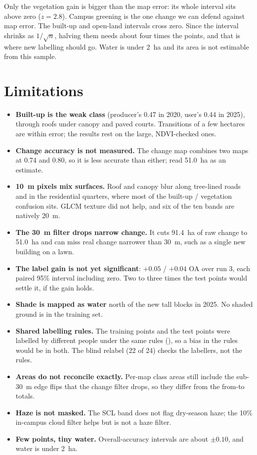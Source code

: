 \documentclass[11pt,a4paper]{article}
\begin{document}
Only the vegetation gain is bigger than the map error: its whole interval sits above zero ($z = 2.8$). Campus greening is the one change we can defend against map error. The built-up and open-land intervals cross zero. Since the interval shrinks as $1/\sqrt{n}$, halving them needs about four times the points, and that is where new labelling should go. Water is under 2~ha and its area is not estimable from this sample.

\section{Limitations}
\begin{itemize}
  \item \textbf{Built-up is the weak class} (producer's 0.47 in 2020, user's 0.44 in 2025), through roofs under canopy and paved courts. Transitions of a few hectares are within error; the results rest on the large, NDVI-checked ones.
  \item \textbf{Change accuracy is not measured.} The change map combines two maps at 0.74 and 0.80, so it is less accurate than either; read 51.0~ha as an estimate.
  \item \textbf{10~m pixels mix surfaces.} Roof and canopy blur along tree-lined roads and in the residential quarters, where most of the built-up / vegetation confusion sits. GLCM texture did not help, and six of the ten bands are natively 20~m.
  \item \textbf{The 30~m filter drops narrow change.} It cuts 91.4~ha of raw change to 51.0~ha and can miss real change narrower than 30~m, such as a single new building on a lawn.
  \item \textbf{The label gain is not yet significant}: $+0.05$ / $+0.04$ OA over run 3, each paired 95\% interval including zero. Two to three times the test points would settle it, if the gain holds.
  \item \textbf{Shade is mapped as water} north of the new tall blocks in 2025. No shaded ground is in the training set.
  \item \textbf{Shared labelling rules.} The training points and the test points were labelled by different people under the same rules (), so a bias in the rules would be in both. The blind relabel (22 of 24) checks the labellers, not the rules.
  \item \textbf{Areas do not reconcile exactly.} Per-map class areas still include the sub-30~m edge flips that the change filter drops, so they differ from the from-to totals.
  \item \textbf{Haze is not masked.} The SCL band does not flag dry-season haze; the 10\% in-campus cloud filter helps but is not a haze filter.
  \item \textbf{Few points, tiny water.} Overall-accuracy intervals are about $\pm 0.10$, and water is under 2~ha.
\end{itemize}
\end{document}
